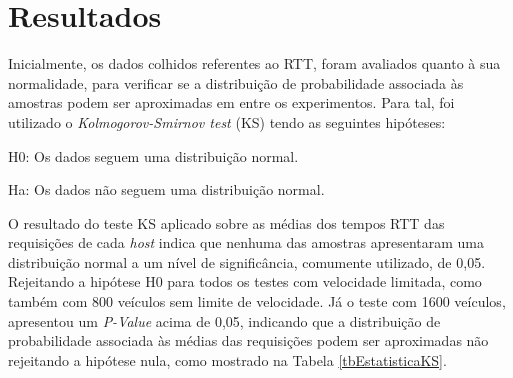 \documentclass[
	12pt,				%
	oneside,			%
	a4paper,			%
	english,			%
	brazil				%
	]{abntex2ppgsi}
\begin{document}
\section{Resultados}

Inicialmente, os dados colhidos referentes ao RTT, foram avaliados quanto à sua normalidade, para verificar se a distribuição de probabilidade associada às amostras podem ser aproximadas em entre os experimentos. Para tal, foi utilizado o \textit{Kolmogorov-Smirnov test} (KS) tendo as seguintes hipóteses:

H0: Os dados seguem uma distribuição normal.

Ha: Os dados não seguem uma distribuição normal.

O resultado do teste KS aplicado sobre as médias dos tempos RTT das requisições de cada \textit{host} indica que nenhuma das amostras apresentaram uma distribuição normal a um nível de significância, comumente utilizado, de 0,05. Rejeitando a hipótese H0 para todos os testes com velocidade limitada, como também com 800 veículos sem limite de velocidade. Já o teste com 1600 veículos, apresentou um \textit{P-Value} acima de 0,05, indicando que a distribuição de probabilidade associada às médias das requisições podem ser aproximadas não rejeitando a hipótese nula, como mostrado na Tabela \ref{tbEstatisticaKS}.
\end{document}
